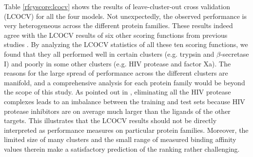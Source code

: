 Table \ref{rfcyscore:lcocv} shows the results of leave-cluster-out cross validation (LCOCV) for all the four models. Not unexpectedly, the observed performance is very heterogeneous across the different protein families. These results indeed agree with the LCOCV results of six other scoring functions from previous studies \citep{774,1414,1194,1410,1347,1415}. By analyzing the LCOCV statistics of all these ten scoring functions, we found that they all performed well in certain clusters (e.g. trypsin and $\beta$-secretase I) and poorly in some other clusters (e.g. HIV protease and factor Xa). The reasons for the large spread of performance across the different clusters are manifold, and a comprehensive analysis for each protein family would be beyond the scope of this study. As pointed out in \citep{1347}, eliminating all the HIV protease complexes leads to an imbalance between the training and test sets because HIV protease inhibitors are on average much larger than the ligands of the other targets. This illustrates that the LCOCV results should not be directly interpreted as performance measures on particular protein families. Moreover, the limited size of many clusters and the small range of measured binding affinity values therein make a satisfactory prediction of the ranking rather challenging.


